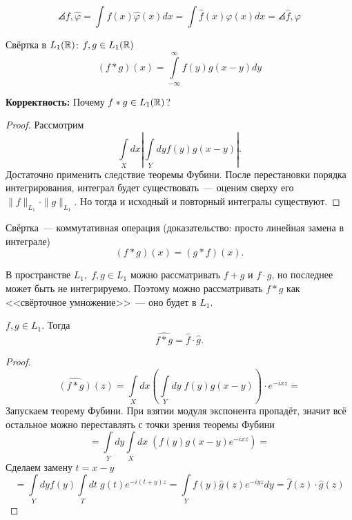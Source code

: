 \begin{unnecessary}
    \begin{example}
    \[\angles{f, \widehat{\varphi}} = \int f(x) \widehat{\varphi}(x)dx = \int \widehat{f}(x) \varphi(x) dx = \angles{\widehat{f}, \varphi}\]
\end{example}
\end{unnecessary}

\begin{definition}
    Свёртка в $L_1(\mathbb{R})$: $f, g \in L_1(\mathbb{R})$
    \[ (f * g)(x) = \int\limits_{-\infty}^{\infty} f(y)g(x-y)dy\]
\end{definition}

\begin{note}
    \textbf{Корректность:} Почему $f * g \in L_1(\mathbb{R})$?
\end{note}

\begin{proof}
Рассмотрим
\[
\int\limits_X dx \left| \int\limits_Y dy f(y) g(x - y) \right|.
\]
Достаточно применить следствие теоремы Фубини. После перестановки порядка интегрирования, интеграл будет существовать~--- оценим сверху его $\|f\|_{L_1} \cdot \|g\|_{L_1}$. Но тогда и исходный и повторный интегралы существуют.
\end{proof}

\begin{statement}
    Свёртка~--- коммутативная операция (доказательство: просто линейная замена в интеграле)
    \[(f*g)(x) = (g * f)(x).\]
\end{statement}

\begin{unnecessary}
\begin{note} В пространстве $L_1, \; f, g \in L_1$ можно рассматривать $f + g$ и $f \cdot g$, но последнее может быть не интегрируемо. Поэтому можно рассматривать $f * g$ как <<свёрточное умножение>>~--- оно будет в $L_1$.
\end{note}
\end{unnecessary}

\begin{theorem}
    $f,g \in L_1$. Тогда
    \[ \widehat{f * g} = \widehat{f} \cdot \widehat{g}.\]
\end{theorem}
\begin{proof}
    \[ \widehat{(f * g)}(z) = \int\limits_X dx \left(\int\limits_Y dy \; f(y) g(x-y)\right) \cdot e^{-ixz} =\]
    Запускаем теорему Фубини. При взятии модуля экспонента пропадёт, значит всё остальное можно переставлять с точки зрения теоремы Фубини
    \[ = \int\limits_Y dy \int\limits_X dx \; (f(y) g(x-y) e^{-ixz}) = \]
    Сделаем замену $t = x-y$
    \[ = \int\limits_Y dy f(y) \int\limits_T dt \; g(t) e^{-i(t+y)z} = \int\limits_Y f(y) \widehat{g}(z) e^{-iyz} dy = \widehat{f}(z) \cdot \widehat{g}(z) \]

\end{proof}

